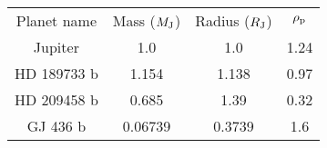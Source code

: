 \begin{table}
\begin{tabular}{cccc}
Planet name & Mass ($M_{\rm J}$) & Radius ($R_{\rm J}$) & $\rho_{\rm p}$ \\
Jupiter & 1.0 & 1.0 & 1.24 \\
HD 189733 b & 1.154 & 1.138 & 0.97 \\
HD 209458 b & 0.685 & 1.39 & 0.32 \\
GJ 436 b & 0.06739 & 0.3739 & 1.6 \\
\end{tabular}
\end{table}
